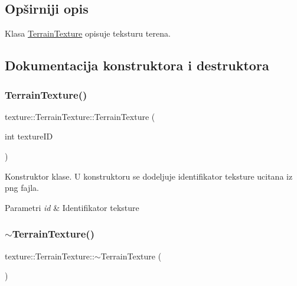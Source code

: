 \subsection{Opširniji opis}
Klasa \hyperlink{classtexture_1_1TerrainTexture}{Terrain\+Texture} opisuje teksturu terena. 

\subsection{Dokumentacija konstruktora i destruktora}
\mbox{\label{classtexture_1_1TerrainTexture_a2aad4f05e7941835c0b9f851a32ee455}} 
\subsubsection{\texorpdfstring{Terrain\+Texture()}{TerrainTexture()}}
{\footnotesize\ttfamily texture\+::\+Terrain\+Texture\+::\+Terrain\+Texture (\begin{DoxyParamCaption}\item[{int}]{texture\+ID }\end{DoxyParamCaption})}



Konstruktor klase. U konstruktoru se dodeljuje identifikator teksture ucitana iz png fajla. 


\begin{DoxyParams}{Parametri}
{\em id} & Identifikator teksture \\
\hline
\end{DoxyParams}
\mbox{\label{classtexture_1_1TerrainTexture_a461b011cd3b6ee4b48b083c1705d0113}} 
\subsubsection{\texorpdfstring{$\sim$\+Terrain\+Texture()}{~TerrainTexture()}}
{\footnotesize\ttfamily texture\+::\+Terrain\+Texture\+::$\sim$\+Terrain\+Texture (\begin{DoxyParamCaption}{ }\end{DoxyParamCaption})}



